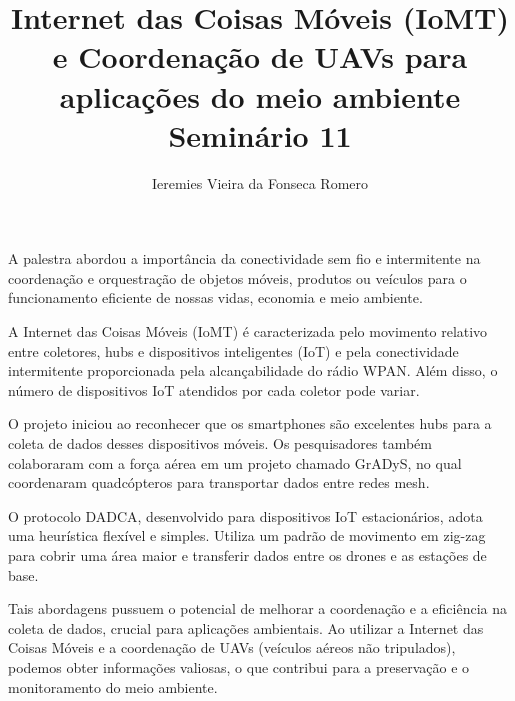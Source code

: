 \documentclass[11pt]{article}
\author{Ieremies Vieira da Fonseca Romero}
\date{}
\title{Internet das Coisas Móveis (IoMT) e Coordenação de UAVs para aplicações do meio ambiente\\\medskip
\large Seminário 11}
\begin{document}
\maketitle
A palestra abordou a importância da conectividade sem fio e intermitente na coordenação e orquestração de objetos móveis, produtos ou veículos para o funcionamento eficiente de nossas vidas, economia e meio ambiente.

A Internet das Coisas Móveis (IoMT) é caracterizada pelo movimento relativo entre coletores, hubs e dispositivos inteligentes (IoT) e pela conectividade intermitente proporcionada pela alcançabilidade do rádio WPAN. Além disso, o número de dispositivos IoT atendidos por cada coletor pode variar.

O projeto iniciou ao reconhecer que os smartphones são excelentes hubs para a coleta de dados desses dispositivos móveis. Os pesquisadores também colaboraram com a força aérea em um projeto chamado GrADyS, no qual coordenaram quadcópteros para transportar dados entre redes mesh.

O protocolo DADCA, desenvolvido para dispositivos IoT estacionários, adota uma heurística flexível e simples. Utiliza um padrão de movimento em zig-zag para cobrir uma área maior e transferir dados entre os drones e as estações de base.

Tais abordagens pussuem o potencial de melhorar a coordenação e a eficiência na coleta de dados, crucial para aplicações ambientais. Ao utilizar a Internet das Coisas Móveis e a coordenação de UAVs (veículos aéreos não tripulados), podemos obter informações valiosas, o que contribui para a preservação e o monitoramento do meio ambiente.
\end{document}
